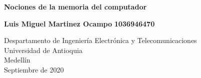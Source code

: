 \documentclass{article}
\begin{document}
\begin{titlepage}
    \begin{center}
        \vspace*{1cm}
            
        \Huge
        \textbf{Nociones de la memoria del computador}
            
        \vspace{0.5cm}
        \LARGE
        
            
        \vspace{5.5cm}
            
        \textbf{Luis Miguel Martinez Ocampo}
        \textbf{1036946470}
            
        \vfill
            
        \vspace{0.8cm}
            
        \Large
        Despartamento de Ingeniería Electrónica y Telecomunicaciones\\
        Universidad de Antioquia\\
        Medellín\\
        Septiembre de 2020
            
    \end{center}
\end{titlepage}

\tableofcontents
\end{document}
